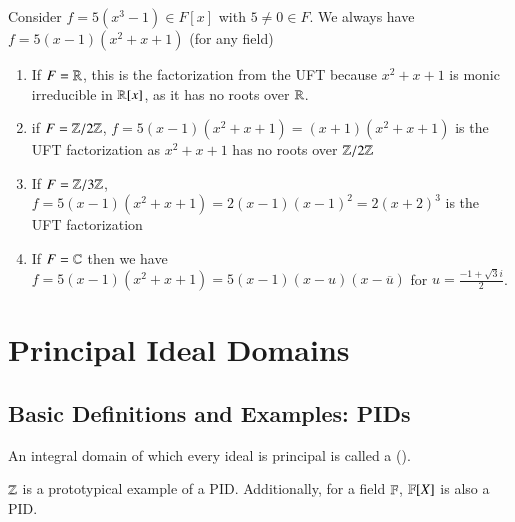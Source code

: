 \documentclass[12pt, a4paper, oneside, openright, titlepage]{book}
\begin{document}
\begin{eg}
        Consider $f = 5(x^3-1) \in F[x]$ with $5 \neq 0 \in F$. We always have $f = 5(x-1)(x^2+x+1)$ (for any field) \begin{enumerate}
                \item If $F = \mathbb R$, this is the factorization from the UFT because $x^2+x+1$ is monic irreducible in $\mathbb R[x]$, as it has no roots over $\mathbb R$.
                \item if $F = \mathbb Z/2\mathbb Z$, $f = 5(x-1)(x^2+x+1) = (x+1)(x^2+x+1)$ is the UFT factorization as $x^2+x+1$ has no roots over $\mathbb Z/2\mathbb Z$
                \item If $F = \mathbb Z/3\mathbb Z$, $f = 5(x-1)(x^2+x+1) = 2(x-1)(x-1)^2 = 2(x+2)^3$ is the UFT factorization
                \item If $F = \mathbb C$ then we have $f = 5(x-1)(x^2+x+1) = 5(x-1)(x-u)(x-\overline{u})$ for $u = \frac{-1+\sqrt{3}i}{2}$.
        \end{enumerate}
\end{eg}



\chapter{\textsection\textsection Principal Ideal Domains}

\section{\textsection Basic Definitions and Examples: PIDs}

\begin{defn}
    An integral domain of which every ideal is principal is called a  ().
\end{defn}

\begin{rmk}
    $\mathbb Z$ is a prototypical example of a PID. Additionally, for a field $\mathbb F$, $\mathbb F[X]$ is also a PID.
\end{rmk}
\end{document}
